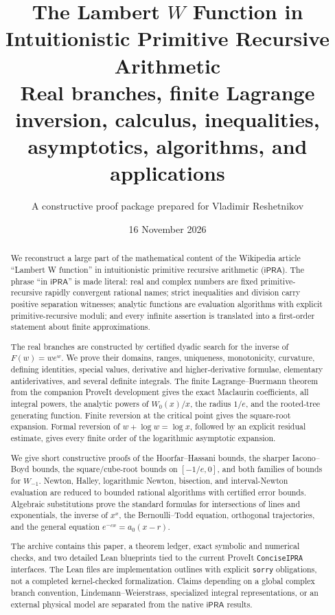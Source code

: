 \documentclass[11pt]{article}
\title{\textbf{The Lambert \(W\) Function in Intuitionistic Primitive Recursive Arithmetic}\\
\large Real branches, finite Lagrange inversion, calculus, inequalities, asymptotics, algorithms, and applications}
\author{A constructive proof package prepared for Vladimir Reshetnikov}
\date{16 November 2026}
\theoremstyle{definition}
\newcommand{\iPRA}{\mathsf{iPRA}}
\newcommand{\code}[1]{\nolinkurl{#1}}
\begin{document}
\maketitle

\begin{abstract}
We reconstruct a large part of the mathematical content of the Wikipedia article
``Lambert W function'' in intuitionistic primitive recursive arithmetic
(\(\iPRA\)).  The phrase ``in \(\iPRA\)'' is made literal: real and complex
numbers are fixed primitive-recursive rapidly convergent rational names;
strict inequalities and division carry positive separation witnesses; analytic
functions are evaluation algorithms with explicit primitive-recursive moduli;
and every infinite assertion is translated into a first-order statement about
finite approximations.

The real branches are constructed by certified dyadic search for the inverse of
\(F(w)=w e^w\).  We prove their domains, ranges, uniqueness, monotonicity,
curvature, defining identities, special values, derivative and higher-derivative
formulae, elementary antiderivatives, and several definite integrals.  The
finite Lagrange--Buermann theorem from the companion ProveIt development gives
the exact Maclaurin coefficients, all integral powers, the analytic powers of
\(W_0(x)/x\), the radius \(1/e\), and the rooted-tree generating function.
Finite reversion at the critical point gives the square-root expansion.
Formal reversion of \(w+\log w=\log x\), followed by an explicit residual
estimate, gives every finite order of the logarithmic asymptotic expansion.

We give short constructive proofs of the Hoorfar--Hassani bounds, the sharper
Iacono--Boyd bounds, the square/cube-root bounds on \([-1/e,0]\), and both
families of bounds for \(W_{-1}\).  Newton, Halley, logarithmic Newton, bisection,
and interval-Newton evaluation are reduced to bounded rational algorithms with
certified error bounds.  Algebraic substitutions prove the standard formulas
for intersections of lines and exponentials, the inverse of \(x^x\), the
Bernoulli--Todd equation, orthogonal trajectories, and the general equation
\(e^{-cx}=a_0(x-r)\).

The archive contains this paper, a theorem ledger, exact symbolic and numerical
checks, and two detailed Lean blueprints tied to the current ProveIt
\code{ConciseIPRA} interfaces.  The Lean files are implementation outlines with
explicit \code{sorry} obligations, not a completed kernel-checked
formalization.  Claims depending on a global complex branch convention,
Lindemann--Weierstrass, specialized integral representations, or an external
physical model are separated from the native \(\iPRA\) results.
\end{abstract}
\end{document}
